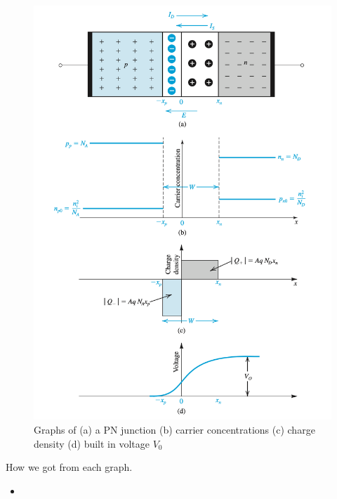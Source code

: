 \begin{figure}[H]
    \centering
    \includegraphics[scale=0.6]{figs/ch03/3_graph.png}
    \caption{Graphs of (a) a PN junction (b) carrier concentrations (c) charge density (d) built in voltage $V_0$}
    \label{fig:3figs}
\end{figure}
How we got from each graph.
\begin{itemize}
    \item 
\end{itemize}

